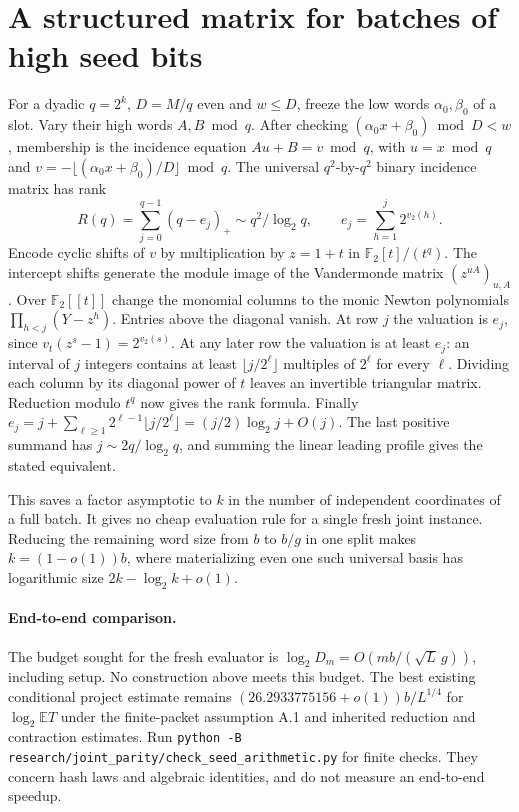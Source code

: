 \documentclass[11pt]{article}
\newcommand{\E}{\mathbb E}
\begin{document}
\section{A structured matrix for batches of high seed bits}
For a dyadic $q=2^k$, $D=M/q$ even and $w\le D$, freeze the low words
$\alpha_0,\beta_0$ of a slot. Vary their high words $A,B\bmod q$.
After checking $(\alpha_0x+\beta_0)\bmod D<w$, membership is the
incidence equation $Au+B=v\bmod q$, with $u=x\bmod q$ and
$v=-\lfloor(\alpha_0x+\beta_0)/D\rfloor\bmod q$. The universal
$q^2$-by-$q^2$ binary incidence matrix has rank
\[
 R(q)=\sum_{j=0}^{q-1}(q-e_j)_+\sim q^2/\log_2 q,\qquad
 e_j=\sum_{h=1}^j2^{v_2(h)}.
\]
Encode cyclic shifts of $v$ by multiplication by $z=1+t$ in
$\mathbb F_2[t]/(t^q)$. The intercept shifts generate the module
image of the Vandermonde matrix $(z^{uA})_{u,A}$. Over
$\mathbb F_2[[t]]$ change the monomial columns to the monic Newton
polynomials $\prod_{h<j}(Y-z^h)$. Entries above the diagonal vanish.
At row $j$ the valuation is $e_j$, since $v_t(z^s-1)=2^{v_2(s)}$.
At any later row the valuation is at least $e_j$: an interval of $j$
integers contains at least $\lfloor j/2^\ell\rfloor$ multiples of
$2^\ell$ for every $\ell$. Dividing each column by its diagonal
power of $t$ leaves an invertible triangular matrix. Reduction modulo
$t^q$ now gives the rank formula. Finally
$e_j=j+\sum_{\ell\ge1}2^{\ell-1}\lfloor j/2^\ell\rfloor
=(j/2)\log_2 j+O(j)$. The last positive summand has
$j\sim 2q/\log_2q$, and summing the linear leading profile gives the
stated equivalent.

This saves a factor asymptotic to $k$ in the number of independent
coordinates of a full batch. It gives no cheap evaluation rule for a
single fresh joint instance. Reducing the remaining word size from $b$
to $b/g$ in one split makes $k=(1-o(1))b$, where materializing even
one such universal basis has logarithmic size $2k-\log_2k+o(1)$.

\paragraph{End-to-end comparison.}
The budget sought for the fresh evaluator is
$\log_2 D_m=O(mb/(\sqrt L\,g))$, including setup. No construction above
meets this budget. The best existing conditional project estimate remains
$(26.2933775156+o(1))b/L^{1/4}$ for $\log_2\E T$ under the finite-packet
assumption A.1 and inherited reduction and contraction estimates.
Run \texttt{python -B research/joint\_parity/check\_seed\_arithmetic.py}
for finite checks. They concern hash laws and algebraic identities,
and do not measure an end-to-end speedup.
\end{document}
